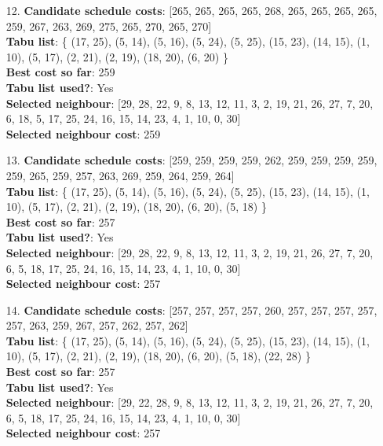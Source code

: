 \documentclass[fleqn]{article}
\begin{document}
\begin{itemize}
    \item[12.] \textbf{Candidate schedule costs}: [265, 265, 265, 265, 268, 265, 265, 265, 265, 259, 267, 263, 269, 275, 265, 270, 265, 270] \\
    \textbf{Tabu list}: \{ (17, 25), (5, 14), (5, 16), (5, 24), (5, 25), (15, 23), (14, 15), (1, 10), (5, 17), (2, 21), (2, 19), (18, 20), (6, 20) \} \\
    \textbf{Best cost so far}: 259 \\
    \textbf{Tabu list used?}: Yes \\
    \textbf{Selected neighbour}: [29, 28, 22, 9, 8, 13, 12, 11, 3, 2, 19, 21, 26, 27, 7, 20, 6, 18, 5, 17, 25, 24, 16, 15, 14, 23, 4, 1, 10, 0, 30] \\
    \textbf{Selected neighbour cost}: 259
      

    \item[13.] \textbf{Candidate schedule costs}: [259, 259, 259, 259, 262, 259, 259, 259, 259, 259, 265, 259, 257, 263, 269, 259, 264, 259, 264] \\
    \textbf{Tabu list}: \{ (17, 25), (5, 14), (5, 16), (5, 24), (5, 25), (15, 23), (14, 15), (1, 10), (5, 17), (2, 21), (2, 19), (18, 20), (6, 20), (5, 18) \} \\
    \textbf{Best cost so far}: 257 \\
    \textbf{Tabu list used?}: Yes \\
    \textbf{Selected neighbour}: [29, 28, 22, 9, 8, 13, 12, 11, 3, 2, 19, 21, 26, 27, 7, 20, 6, 5, 18, 17, 25, 24, 16, 15, 14, 23, 4, 1, 10, 0, 30] \\
    \textbf{Selected neighbour cost}: 257
      

    \item[14.] \textbf{Candidate schedule costs}: [257, 257, 257, 257, 260, 257, 257, 257, 257, 257, 263, 259, 267, 257, 262, 257, 262] \\
    \textbf{Tabu list}: \{ (17, 25), (5, 14), (5, 16), (5, 24), (5, 25), (15, 23), (14, 15), (1, 10), (5, 17), (2, 21), (2, 19), (18, 20), (6, 20), (5, 18), (22, 28) \} \\
    \textbf{Best cost so far}: 257 \\
    \textbf{Tabu list used?}: Yes \\
    \textbf{Selected neighbour}: [29, 22, 28, 9, 8, 13, 12, 11, 3, 2, 19, 21, 26, 27, 7, 20, 6, 5, 18, 17, 25, 24, 16, 15, 14, 23, 4, 1, 10, 0, 30] \\
    \textbf{Selected neighbour cost}: 257
      


\end{itemize}
\end{document}
